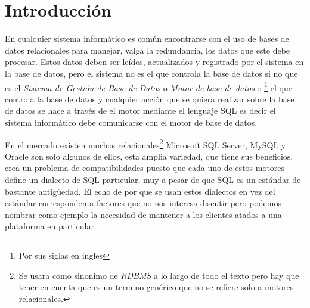 \chapter{Introducción}\label{capitulo:intro}
En cualquier sistema informático es común encontrarse con el uso de bases de datos relacionales para manejar, valga la redundancia, los datos que este debe procesar. Estos datos deben ser leídos, actualizados y registrado por el sistema en la base de datos, pero el sistema no es el que controla la base de datos si no que es el \textit{Sistema de Gestión de Base de Datos} o \textit{Motor de base de datos} o \textit{\dd}\footnote{Por sus siglas en ingles} el que controla la base de datos y cualquier acción que se quiera realizar sobre la base de datos se hace a través de el motor mediante el lenguaje SQL es decir el sistema informático debe comunicarse con el motor de base de datos.

En el mercado existen muchos \dd relacionales\footnote{Se usara \dd como sinonimo de \textit{RDBMS} a lo largo de todo el texto pero hay que tener en cuenta que \dd es un termino genérico que no se refiere solo a motores relacionales.} Microsoft SQL Server, MySQL y Oracle son solo algunos de ellos, esta amplia variedad, que tiene sus beneficios, crea un problema de compatibilidades puesto que cada uno de estos motores define un dialecto de SQL particular, muy a pesar de que SQL es un estándar de bastante antigüedad. El echo de por que se usan estos dialectos en vez del estándar corresponden a factores que no nos interesa discutir pero podemos nombrar como ejemplo la necesidad de mantener a los clientes atados a una plataforma en particular.

